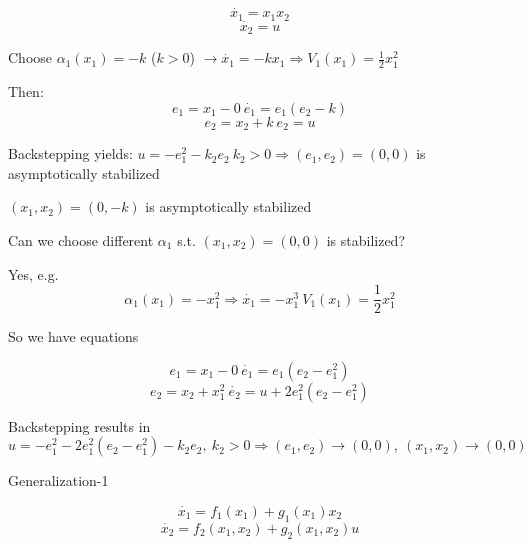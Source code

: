 \begin{Example}
\begin{equation*}
\dot{x_1} = x_1x_2
\end{equation*}
\begin{equation*}
\dot{x_2} = u
\end{equation*}

Choose $\alpha_1(x_1) = -k$ ($k > 0$) $\rightarrow \dot{x_1} = -k x_1 \Rightarrow V_1(x_1) = \frac{1}{2}x_1^2$

Then: 
\begin{equation*}
e_1 = x_1 - 0 \ \dot{e_1} = e_1(e_2 - k)
\end{equation*}
\begin{equation*}
e_2 = x_2 + k \ e_2 = u
\end{equation*}

Backstepping yields: $u = - e_1^2 - k_2e_2 \ k_2 > 0 \Rightarrow (e_1,e_2) = (0,0)$ is asymptotically stabilized

$(x_1, x_2) = (0,-k)$ is asymptotically stabilized

Can we choose different $\alpha_1$ s.t. $(x_1, x_2) = (0,0)$ is stabilized?

Yes, e.g.
\begin{equation*}
\alpha_1(x_1) = -x_1^2 \Rightarrow \dot{x_1} = - x_1^3 \ V_1(x_1) = \frac{1}{2}x_1^2
\end{equation*}

So we have equations

\begin{equation*}
e_1 = x_1 - 0 \ \dot{e_1}  = e_1(e_2 - e_1^2) 
\end{equation*}
\begin{equation*}
e_2 = x_2 + x_1^2 \ \dot{e_2} = u + 2e_1^2(e_2 - e_1^2)
\end{equation*}

Backstepping results in 
\begin{equation*}
u = -e_1^2 - 2e_1^2(e_2 - e_1^2) - k_2e_2, \ k_2 > 0 \Rightarrow (e_1,e_2) \to (0,0), \ (x_1, x_2) \to (0,0)
\end{equation*}
\end{Example}

Generalization-1

\begin{equation*}
\dot{x_1} = f_1(x_1) + g_1(x_1)x_2
\end{equation*}
\begin{equation*}
\dot{x_2} = f_2(x_1, x_2) + g_2(x_1,x_2)u
\end{equation*}


